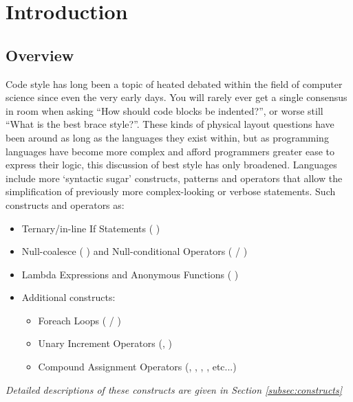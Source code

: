 \documentclass{article}
\begin{document}
\newpage
\section{Introduction}
    \subsection{Overview}
    \label{sec:overview}
        Code style has long been a topic of heated debated within the field of computer science since even the very early days. You will rarely ever get a single consensus in room when asking ``How should code blocks be indented?'', or worse still ``What is the best brace style?''. These kinds of physical layout questions have been around as long as the languages they exist within, but as programming languages have become more complex and afford programmers greater ease to express their logic, this discussion of best style has only broadened. Languages include more `syntactic sugar' constructs, patterns and operators that allow the simplification of previously more complex-looking or verbose statements. Such constructs and operators as:

        \begin{itemize}
            \item Ternary/in-line If Statements (  )
            \item Null-coalesce (  ) and Null-conditional Operators (  / )
            \item Lambda Expressions and Anonymous Functions (  )
            \item Additional constructs:
            \begin{itemize}
                \item Foreach Loops (  / )
                \item Unary Increment Operators (, )
                \item Compound Assignment Operators (,  , , , etc...)
            \end{itemize}
        \end{itemize}
        
        \emph{Detailed descriptions of these constructs are given in Section \ref{subsec:constructs}}\\
\end{document}
